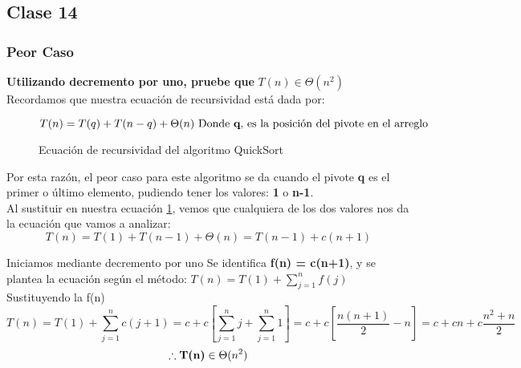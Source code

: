     \subsection*{Clase 14}
        \subsubsection*{Peor Caso}
            \textbf{Utilizando decremento por uno, pruebe que} $T(n) \in \Theta(n^2)$\\
            Recordamos que nuestra ecuación de recursividad está dada por:
            \begin{figure}
                \centering
                \begin{equation*}
                    T(n) = T(q)+T(n-q)+\Theta(n) \text{ Donde \textbf{q}, es la posición del pivote en el arreglo}
                \end{equation*}
                \caption{Ecuación de recursividad del algoritmo QuickSort}
                \label{EcuacionQuickSort}
            \end{figure}
            Por esta razón, el peor caso para este algoritmo se da cuando el pivote \textbf{q} es el primer o último elemento, pudiendo tener los valores: \textbf{1} o \textbf{n-1}.\\
            
            Al sustituir en nuestra ecuación \ref{EcuacionQuickSort}, vemos que cualquiera de los dos valores nos da la ecuación que vamos a analizar:
            \begin{equation*}
                T(n)=T(1)+T(n-1)+\Theta(n) = T(n-1)+c(n+1)
            \end{equation*}
            
            Iniciamos mediante decremento por uno
            Se identifica \textbf{f(n) = c(n+1)}, y se plantea la ecuación según el método:
            $T(n)=T(1)+\sum_{j=1}^nf(j)$\\
            Sustituyendo la f(n) \\
            \begin{equation*}
                   T(n)= T(1)+\sum_{j=1}^nc(j+1)=c+c\left[ \sum_{j=1}^nj +\sum_{j=1}^n1\right] = c+c\left[ \frac{n(n+1)}{2} -n \right]=c+cn+c\frac{n^2+n}{2}
            \end{equation*}
            \begin{equation*}
                   \therefore \text{\textbf{T(n)}}\in\Theta(n^2)
            \end{equation*}
            
